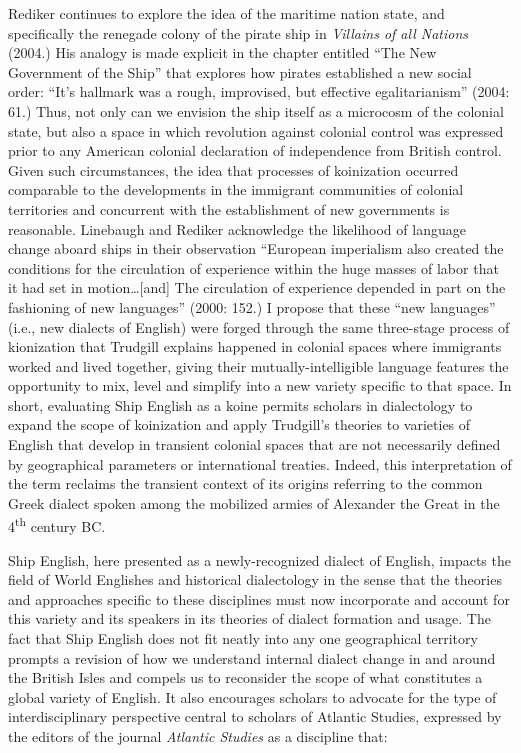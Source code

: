 Rediker continues to explore the idea of the maritime nation state, and specifically the renegade colony of the pirate ship in \textit{Villains of all Nations} (2004.) His analogy is made explicit in the chapter entitled “The New Government of the Ship” that explores how pirates established a new social order: “It’s hallmark was a rough, improvised, but effective egalitarianism” (2004: 61.) Thus, not only can we envision the ship itself as a microcosm of the colonial state, but also a space in which revolution against colonial control was expressed prior to any American colonial declaration of independence from British control. Given such circumstances, the idea that processes of koinization occurred comparable to the developments in the immigrant communities of colonial territories and concurrent with the establishment of new governments is reasonable. Linebaugh and Rediker acknowledge the likelihood of language change aboard ships in their observation “European imperialism also created the conditions for the circulation of experience within the huge masses of labor that it had set in motion…[and] The circulation of experience depended in part on the fashioning of new languages” (2000: 152.) I propose that these “new languages” (i.e., new dialects of English) were forged through the same three-stage process of kionization that Trudgill explains happened in colonial spaces where immigrants worked and lived together, giving their mutually-intelligible language features the opportunity to mix, level and simplify into a new variety specific to that space. In short, evaluating Ship English as a koine permits scholars in dialectology to expand the scope of koinization and apply Trudgill’s theories to varieties of English that develop in transient colonial spaces that are not necessarily defined by geographical parameters or international treaties. Indeed, this interpretation of the term reclaims the transient context of its origins referring to the common Greek dialect spoken among the mobilized armies of Alexander the Great in the 4\textsuperscript{th} century BC. 

  Ship English, here presented as a newly-recognized dialect of English, impacts the field of World Englishes and historical dialectology in the sense that the theories and approaches specific to these disciplines must now incorporate and account for this variety and its speakers in its theories of dialect formation and usage. The fact that Ship English does not fit neatly into any one geographical territory prompts a revision of how we understand internal dialect change in and around the British Isles and compels us to reconsider the scope of what constitutes a global variety of English. It also encourages scholars to advocate for the type of interdisciplinary perspective central to scholars of Atlantic Studies, expressed by the editors of the journal \textit{Atlantic Studies} as a discipline that:

